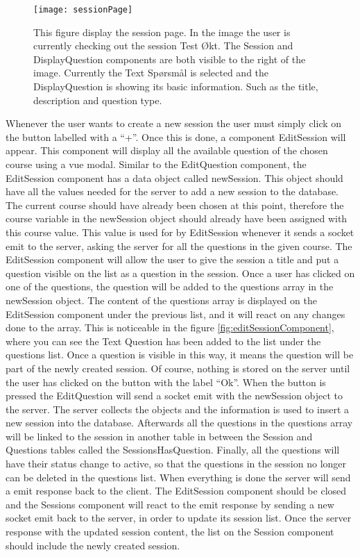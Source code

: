 \begin{figure}[H]
	\texttt{[image: sessionPage]}
	\caption{This figure display the session page. In the image the user is currently checking out the session Test Økt. The Session and DisplayQuestion components are both visible to the right of the image. Currently the Text Spørsmål is selected and the DisplayQuestion is showing its basic information. Such as the title, description and question type.}
	\label{fig:sessionPage}
\end{figure}
Whenever the user wants to create a new session the user must simply click on the button labelled with a “+”. Once this is done, a component EditSession will appear. This component will display all the available question of the chosen course using a vue modal. Similar to the EditQuestion component, the EditSession component has a data object called newSession. This object should have all the values needed for the server to add a new session to the database. The current course should have already been chosen at this point, therefore the course variable in the newSession object should already have been assigned with this course value. This value is used for by EditSession whenever it sends a socket emit to the server, asking the server for all the questions in the given course. The EditSession component will allow the user to give the session a title and put a question visible on the list as a question in the session. Once a user has clicked on one of the questions, the question will be added to the questions array in the newSession object. The content of the questions array is displayed on the EditSession component under the previous list, and it will react on any changes done to the array. This is noticeable in the figure \ref{fig:editSessionComponent}, where you can see the Text Question has been added to the list under the questions list. Once a question is visible in this way, it means the question will be part of the newly created session. Of course, nothing is stored on the server until the user has clicked on the button with the label “Ok”. When the button is pressed the EditQuestion will send a socket emit with the newSession object to the server. The server collects the objects and the information is used to insert a new session into the database. Afterwards all the questions in the questions array will be linked to the session in another table in between the Session and Questions tables called the SessionsHasQuestion. Finally, all the questions will have their status change to active, so that the questions in the session no longer can be deleted in the questions list. When everything is done the server will send a emit response back to the client. The EditSession component should be closed and the Sessions component will react to the emit response by sending a new socket emit back to the server, in order to update its session list. Once the server response with the updated session content, the list on the Session component should include the newly created session.  
